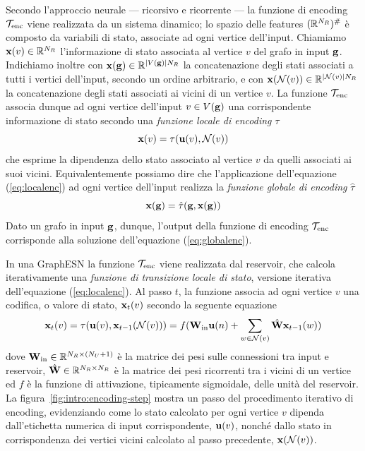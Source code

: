 Secondo l'approccio neurale --- ricorsivo e ricorrente --- la funzione di encoding $\mathcal{T}_\textup{enc}$ viene realizzata da un sistema dinamico; lo spazio delle features $(\mathbb{R}^{N_R})^{\#}$ è composto da variabili di stato, associate ad ogni vertice dell'input. Chiamiamo $\mathbf{x}(v) \in \mathbb{R}^{N_R}$ l'informazione di stato associata al vertice $v$ del grafo in input $\mathbf{g}$. Indichiamo inoltre con $\mathbf{x}(\mathbf{g}) \in \mathbb{R}^{\lvert V(\mathbf{g})\rvert N_R}$ la concatenazione degli stati associati a tutti i vertici dell'input, secondo un ordine arbitrario, e con $\mathbf{x}(\mathcal{N}(v)) \in \mathbb{R}^{\lvert\mathcal{N}(v)\rvert N_R}$ la concatenazione degli stati associati ai vicini di un vertice $v$. La funzione $\mathcal{T}_\textup{enc}$ associa dunque ad ogni vertice dell'input $v \in V(\mathbf{g})$ una corrispondente informazione di stato secondo una \emph{funzione locale di encoding} $\tau$
\begin{equation}\label{eq:localenc}
\mathbf{x}(v) = \tau(\mathbf{u}(v), \mathcal{N}(v))
\end{equation}
che esprime la dipendenza dello stato associato al vertice $v$ da quelli associati ai suoi vicini. Equivalentemente possiamo dire che l'applicazione dell'equazione (\ref{eq:localenc}) ad ogni vertice dell'input realizza la \emph{funzione globale di encoding} $\hat{\tau}$
\begin{equation}\label{eq:globalenc}
\mathbf{x}(\mathbf{g}) = \hat{\tau}(\mathbf{g}, \mathbf{x}(\mathbf{g}))
\end{equation}
Dato un grafo in input $\mathbf{g}$, dunque, l'output della funzione di encoding $\mathcal{T}_\textup{enc}$ corrisponde alla soluzione dell'equazione (\ref{eq:globalenc}).

In una GraphESN la funzione $\mathcal{T}_\textup{enc}$ viene realizzata dal reservoir, che calcola iterativamente una \emph{funzione di transizione locale di stato}, versione iterativa dell'equazione (\ref{eq:localenc}). Al passo $t$, la funzione associa ad ogni vertice $v$ una codifica, o valore di stato, $\mathbf{x}_t(v)$ secondo la seguente equazione
\begin{equation}\label{intro:gesn:reservoir}
\vect{x}_t(v) 	= \tau( \vect{u}(v), \vect{x}_{t-1}(\mathcal{N}(v)) ) 
				= f( \matr{W}_{\textup{in}} \vect{u}(n) + \sum_{w \in \mathcal{N}(v)} \hat{\matr{W}} \vect{x}_{t-1}(w) )
\end{equation}
dove $\matr{W}_{\textup{in}} \in \R^{N_R \times (N_U + 1)}$ è la matrice dei pesi sulle connessioni tra input e reservoir, $\hat{\matr{W}} \in \R^{N_R \times N_R}$ è la matrice dei pesi ricorrenti tra i vicini di un vertice ed $f$ è la funzione di attivazione, tipicamente sigmoidale, delle unità del reservoir. La figura~\vref{fig:intro:encoding-step} mostra un passo del procedimento iterativo di encoding, evidenziando come lo stato calcolato per ogni vertice $v$ dipenda dall'etichetta numerica di input corrispondente, $\mathbf{u}(v)$, nonché dallo stato in corrispondenza dei vertici vicini calcolato al passo precedente, $\mathbf{x}(\mathcal{N}(v))$.

